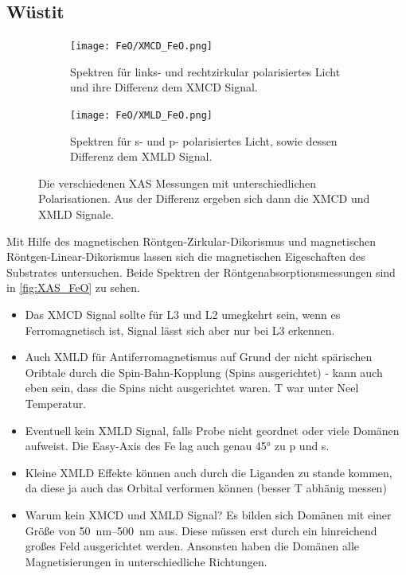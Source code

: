             \subsection{Wüstit}
            \begin{figure}
                \centering
                \begin{subfigure}[t]{0.48\textwidth}
                    \centering
                    \texttt{[image: FeO/XMCD\_FeO.png]}
                    \caption{Spektren für links- und rechtzirkular polarisiertes Licht und ihre Differenz dem XMCD Signal.}
                    \label{fig:XMCD}
                \end{subfigure}
                \begin{subfigure}[t]{0.48\textwidth}
                    \centering
                    \texttt{[image: FeO/XMLD\_FeO.png]}
                    \caption{Spektren für s- und p- polarisiertes Licht, sowie dessen Differenz dem XMLD Signal.}
                    \label{fig:XMLD}
                \end{subfigure}
                \caption{Die verschiedenen XAS Messungen mit unterschiedlichen Polarisationen. Aus der Differenz ergeben sich dann die XMCD und XMLD Signale.}
                \label{fig:XAS_FeO}
            \end{figure}
            Mit Hilfe des magnetischen Röntgen-Zirkular-Dikorismus und magnetischen Röntgen-Linear-Dikorismus lassen sich die magnetischen Eigeschaften des Substrates untersuchen.
            Beide Spektren der Röntgenabsorptionsmessungen sind in \autoref{fig:XAS_FeO} zu sehen.
            \begin{itemize}
                \item Das XMCD Signal sollte für L3 und L2 umegkehrt sein, wenn es Ferromagnetisch ist, Signal lässt sich aber nur bei L3 erkennen.
                \item Auch XMLD für Antiferromagnetismus auf Grund der nicht spärischen Oribtale durch die Spin-Bahn-Kopplung (Spins ausgerichtet) \cite{stohr_magnetism_2006} - kann auch eben sein, dass die Spins nicht ausgerichtet waren. T war unter Neel Temperatur.
                \item Eventuell kein XMLD Signal, falls Probe nicht geordnet oder viele Domänen aufweist. Die Easy-Axis des Fe lag auch genau 45° zu p und s.
                \item Kleine XMLD Effekte können auch durch die Liganden zu stande kommen, da diese ja auch das Orbital verformen können (besser T abhänig messen)
                \item Warum kein XMCD und XMLD Signal? Es bilden sich Domänen mit einer Größe von \SIrange{50}{500}{\nano\meter} aus. Diese müssen erst durch ein hinreichend großes Feld ausgerichtet werden. Ansonsten haben die Domänen alle Magnetisierungen in unterschiedliche Richtungen. \cite{cornell_iron_2003}
            \end{itemize}

